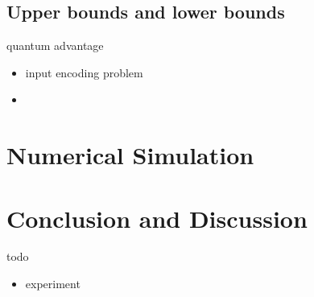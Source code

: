 \documentclass[
aps,
pra,
linenumbers,
floatfix,
]{revtex4-2}
\theoremstyle{plain}
\theoremstyle{definition}
\begin{document}
\subsection{Upper bounds and lower bounds}
quantum advantage
\begin{itemize}
	\item input encoding problem \cite{tangQuantumPrincipalComponent2021}
	\item 
\end{itemize}

\section{Numerical Simulation}
% 
% 

\section{Conclusion and Discussion}
todo
\begin{itemize}
	\item experiment
\end{itemize}




%


\onecolumngrid
\appendix
%
%
%
%
\end{document}
